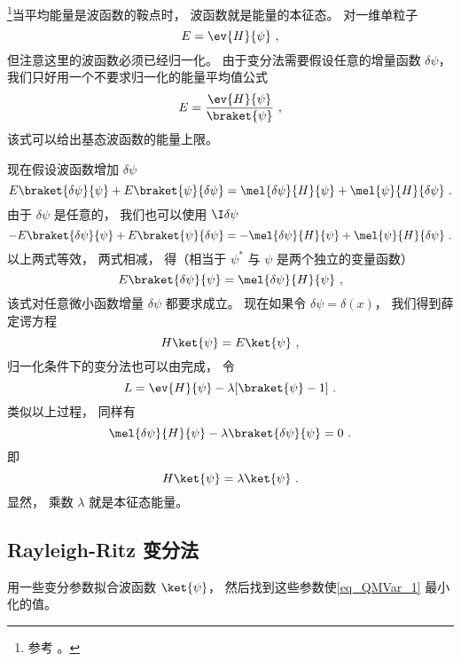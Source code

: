

\footnote{参考 \cite{Bransden}。}当平均能量是波函数的鞍点时， 波函数就是能量的本征态。 对一维单粒子
\begin{equation}
E = \ev{H}{\psi}~,
\end{equation}
但注意这里的波函数必须已经归一化。 由于变分法需要假设任意的增量函数 $\delta \psi $，  我们只好用一个不要求归一化的能量平均值公式
\begin{equation}\label{eq_QMVar_1}
E = \frac{\ev{H}{\psi}}{\braket{\psi}}~,
\end{equation}
该式可以给出基态波函数的能量上限。

现在假设波函数增加 $\delta \psi$ 
\begin{equation}
E \braket{\delta\psi}{\psi} + E\braket{\psi}{\delta\psi}
= \mel{\delta \psi}{H}{\psi} + \mel{\psi}{H}{\delta\psi}~.
\end{equation}
由于 $\delta\psi$ 是任意的， 我们也可以使用 $\I\delta\psi$ 
\begin{equation}
-E \braket{\delta\psi}{\psi} + E \braket{\psi}{\delta\psi}
= -\mel{\delta\psi}{H}{\psi} + \mel{\psi}{H}{\delta\psi}~.
\end{equation}
以上两式等效， 两式相减， 得（相当于 $\psi^*$ 与 $\psi$ 是两个独立的变量函数）
\begin{equation}
E\braket{\delta\psi}{\psi} = \mel{\delta\psi}{H}{\psi}~,
\end{equation}
该式对任意微小函数增量 $\delta\psi $ 都要求成立。 现在如果令 $\delta \psi  = \delta (x)$，  我们得到薛定谔方程
\begin{equation}
H \ket{\psi} = E\ket{\psi}~,
\end{equation}
归一化条件下的变分法也可以由完成， 令
\begin{equation}
L = \ev{H}{\psi} - \lambda [\braket{\psi} - 1]~.
\end{equation}
类似以上过程， 同样有
\begin{equation}
\mel{\delta\psi}{H}{\psi} - \lambda\braket{\delta\psi}{\psi} = 0~.
\end{equation}
即
\begin{equation}
H \ket{\psi} = \lambda \ket{\psi}~.
\end{equation}
显然， 乘数 $\lambda $ 就是本征态能量。

\subsection{Rayleigh-Ritz 变分法}
用一些变分参数拟合波函数 $\ket{\psi}$， 然后找到这些参数使\autoref{eq_QMVar_1} 最小化的值。

